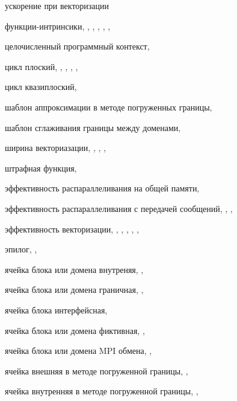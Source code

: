ускорение при векторизации

функции-интринсики, \pageref{term:intrinsic}, \pageref{term:intrinsic2}, \pageref{term:intrinsic3}, \pageref{term:intrinsic4}, \pageref{term:intrinsic5}, \pageref{term:intrinsic6}

целочисленный программный контекст, \pageref{term:integer_context}

цикл плоский, \pageref{term:flat_loop}, \pageref{term:flat_loop2}, \pageref{term:flat_loop3}, \pageref{term:flat_loop4}, \pageref{term:flat_loop5}

цикл квазиплоский, \pageref{term:flat_kvazy_flat}

шаблон аппроксимации в методе погруженных границы, \pageref{term:ibm_template}

шаблон сглаживания границы между доменами, \pageref{term:smooth_template}

ширина векториазации, \pageref{term:vec_shir}, \pageref{term:vec_shir2}, \pageref{term:vec_shir3}, \pageref{term:vec_shir4}

штрафная функция, \pageref{term:penalty_function}

эффективность распараллеливания на общей памяти, \pageref{term:shr_eff}

эффективность распараллеливания с передачей сообщений, \pageref{term:msg_eff}, \pageref{term:msg_eff2}, \pageref{term:msg_eff3}

эффективность векторизации, \pageref{term:vec_eff}, \pageref{term:vec_eff2}, \pageref{term:vec_eff3}, \pageref{term:vec_eff4}, \pageref{term:vec_eff5}, \pageref{term:vec_eff6}

эпилог, \pageref{term:epilog}, \pageref{term:epilog2}

ячейка блока или домена внутреняя, \pageref{term:cell_block_inner}, \pageref{term:cell_block_inner2}

ячейка блока или домена граничная, \pageref{term:cell_block_border}, \pageref{term:cell_block_border2}

ячейка блока интерфейсная, \pageref{term:cell_block_interface}

ячейка блока или домена фиктивная, \pageref{term:cell_block_ghost}, \pageref{term:cell_block_ghost2}

ячейка блока или домена MPI обмена, \pageref{term:cell_block_mpi}, \pageref{term:cell_block_mpi2}

ячейка внешняя в методе погруженной границы, \pageref{term:cell_ibm_outer}, \pageref{term:cell_ibm_outer2}

ячейка внутренняя в методе погруженной границы, \pageref{term:cell_ibm_innner}, \pageref{term:cell_ibm_innner2}

